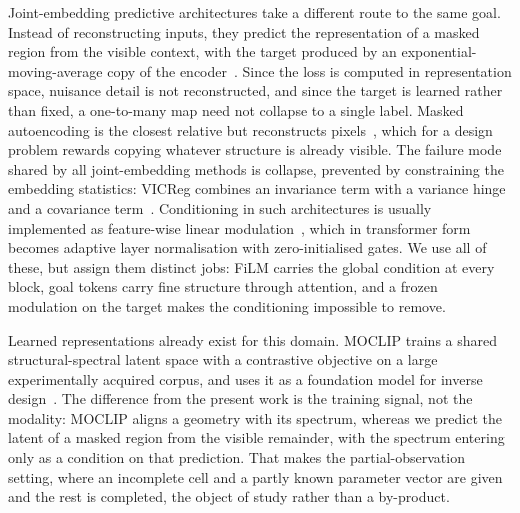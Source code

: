 \documentclass[pdflatex,oneside,sn-mathphys-num]{sn-jnl}
\theoremstyle{thmstyleone}
\theoremstyle{thmstyletwo}
\theoremstyle{thmstylethree}
\begin{document}
Joint-embedding predictive architectures take a different route to the same goal. Instead
of reconstructing inputs, they predict the representation of a masked region from the
visible context, with the target produced by an exponential-moving-average copy of the
encoder~\cite{ijepa}. Since the loss is computed in representation space, nuisance
detail is not reconstructed, and since the target is learned rather than fixed, a
one-to-many map need not collapse to a single label. Masked autoencoding is the closest
relative but reconstructs pixels~\cite{mae}, which for a design problem rewards copying
whatever structure is already visible. The failure mode shared by all joint-embedding
methods is collapse, prevented by constraining the embedding statistics: VICReg combines
an invariance term with a variance hinge and a covariance term~\cite{vicreg}. Conditioning in such
architectures is usually implemented as feature-wise linear modulation~\cite{film},
which in transformer form becomes adaptive layer normalisation with zero-initialised
gates. We use all of these, but assign them distinct jobs: FiLM carries the
global condition at every block, goal tokens carry fine structure through attention, and
a frozen modulation on the target makes the conditioning impossible to remove.

Learned representations already exist for this domain. MOCLIP trains a shared
structural-spectral latent space with a contrastive objective on a large experimentally
acquired corpus, and uses it as a foundation model for inverse design~\cite{moclip}. The
difference from the present work is the training signal, not the modality: MOCLIP aligns a
geometry with its spectrum, whereas we predict the latent of a masked region from the
visible remainder, with the spectrum entering only as a condition on that prediction. That
makes the partial-observation setting, where an incomplete cell and a partly known parameter
vector are given and the rest is completed, the object of study rather than a by-product.
\end{document}

